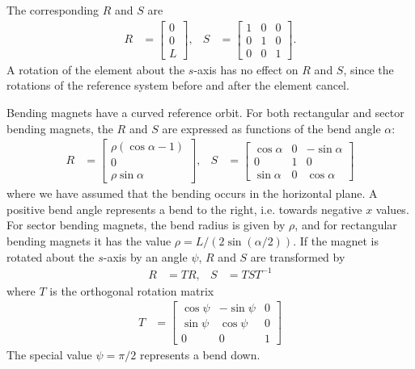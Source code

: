 The corresponding $R$ and $S$ are
\begin{align}
  R &=
    \begin{bmatrix}
      0\\
      0\\
      L
    \end{bmatrix},
  &
  S &=
    \begin{bmatrix}
      1 & 0 & 0\\
      0 & 1 & 0\\
      0 & 0 & 1
    \end{bmatrix}.
\end{align}
A rotation of the element about the $s$-axis has no effect on $R$ and $S$, since the rotations of
the reference system before and after the element cancel.

Bending magnets have a curved reference orbit. For both rectangular and sector bending
magnets, the $R$ and $S$ are expressed as functions of the bend angle $\alpha$:
\begin{align}
  R &=
    \begin{bmatrix}
      \rho(\cos \alpha-1)\\
      0\\
      \rho\sin\alpha
    \end{bmatrix},
  &
  S &=
    \begin{bmatrix}
      \cos\alpha & 0 & -\sin\alpha\\
      0 & 1 & 0\\
      \sin\alpha & 0 & \cos \alpha
    \end{bmatrix}
\end{align}
where we have assumed that the bending occurs in the horizontal plane.
A positive bend angle represents a bend to the right, i.e. towards negative $x$ values. For
sector bending magnets, the bend radius is given by $\rho$, and for rectangular bending magnets
it has the value $\rho=L/(2 \sin( \alpha/2))$. If the magnet is rotated about the $s$-axis by an
angle $\psi$, $R$ and $S$ are transformed by
\begin{align}
  R &= T R, &
  S &= T S T^{-1}
\end{align}
where $T$ is the orthogonal rotation matrix
\begin{align}
  T &=
    \begin{bmatrix}
      \cos \psi & -\sin \psi & 0\\
      \sin \psi & \cos \psi & 0\\
      0 & 0 & 1
    \end{bmatrix}
\end{align}
The special value $\psi=\pi/2$ represents a bend down.

